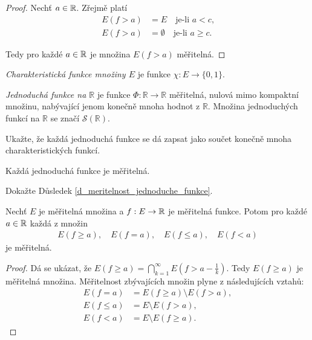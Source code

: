 \begin{proof}
Nechť $a \in \mathbb{R}$. Zřejmě platí
\begin{align*}
E(f>a)&=E \quad  \text{je-li $a<c$,} \\
E(f>a)&=\emptyset \quad \text{je-li $a \geq c$.} 
\end{align*}

Tedy pro každé $a \in \mathbb{R}$ je množina $E(f>a)$ měřitelná.
\end{proof}

\begin{definition}
\label{char_f}
\textit{Charakteristická funkce množiny $E$} je funkce $ \chi :E \to \{0,1\}$.
\end{definition}

\begin{definition}\label{d_Jednoducha_Funkce}
\textit{Jednoduchá funkce na $\mathbb{R}$} je funkce $\Phi:\mathbb{R} \to \mathbb{R}$ měřitelná, nulová mimo kompaktní množinu, nabývající jenom konečně mnoha hodnot z $\mathbb{R}$.
Množina jednoduchých funkcí na $\mathbb{R}$ se značí $\mathcal{S}(\mathbb{R})$.
\end{definition}

\begin{uloha}
Ukažte, že každá jednoduchá funkce se dá zapsat jako součet konečně mnoha charakteristických funkcí.
\end{uloha}


\begin{dusledek}
Každá jednoduchá funkce je měřitelná. 
\label{d_meritelnost_jednoduche_funkce}
\end{dusledek}

\begin{uloha}
Dokažte Důsledek \ref{d_meritelnost_jednoduche_funkce}.
\end{uloha}

\begin{theorem}
Nechť $E$ je měřitelná množina a $f:E \to \mathbb{R}$ je měřitelná funkce.
Potom pro každé $a \in \mathbb{R}$ každá z množin 
\begin{align*}
E(f \geq a), \quad E(f=a), \quad E(f \leq a), \quad E(f<a)
\end{align*}
je měřitelná.
\label{v_1.6}
\end{theorem}

\begin{proof}
Dá se ukázat, že $E(f \geq a)= \bigcap \limits _{k=1}^{\infty} E(f>a-\frac{1}{k})$.
Tedy $E(f \geq a)$ je měřitelná množina. Měřitelnost zbývajících množin plyne z následujících vztah\r u:
\begin{align*}
E(f=a) &=E(f \geq a) \setminus E(f>a), \\
E(f \leq a) &=E \setminus E(f>a), \\
E(f < a) &=E \setminus E(f \geq a).
\end{align*}
\end{proof}

